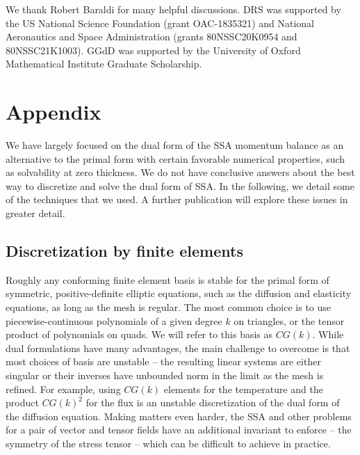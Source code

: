 \documentclass[twocolumn,letterpaper]{igs}
\begin{document}
We thank Robert Baraldi for many helpful discussions.
DRS was supported by the US National Science Foundation (grant OAC-1835321) and National Aeronautics and Space Administration (grants 80NSSC20K0954 and 80NSSC21K1003).
GGdD was supported by the University of Oxford Mathematical Institute Graduate Scholarship.




\pagebreak



\appendix\section{Appendix}

We have largely focused on the dual form of the SSA momentum balance as an alternative to the primal form with certain favorable numerical properties, such as solvability at zero thickness.
We do not have conclusive answers about the best way to discretize and solve the dual form of SSA.
In the following, we detail some of the techniques that we used.
A further publication will explore these issues in greater detail.

\subsection{Discretization by finite elements}
\label{app:discretization}

Roughly any conforming finite element basis is stable for the primal form of symmetric, positive-definite elliptic equations, such as the diffusion and elasticity equations, as long as the mesh is regular.
The most common choice is to use piecewise-continuous polynomials of a given degree $k$ on triangles, or the tensor product of polynomials on quads.
We will refer to this basis as $CG(k)$.
While dual formulations have many advantages, the main challenge to overcome is that most choices of basis are unstable -- the resulting linear systems are either singular or their inverses have unbounded norm in the limit as the mesh is refined.
For example, using $CG(k)$ elements for the temperature and the product $CG(k)^2$ for the flux is an unstable discretization of the dual form of the diffusion equation.
Making matters even harder, the SSA and other problems for a pair of vector and tensor fields have an additional invariant to enforce -- the symmetry of the stress tensor -- which can be difficult to achieve in practice.
\end{document}
